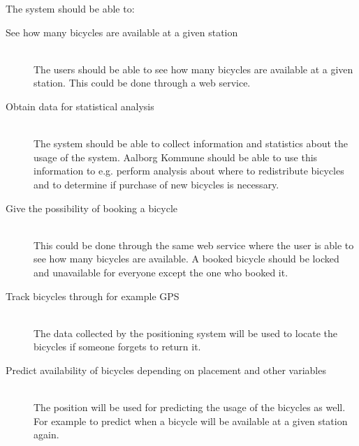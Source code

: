 The system should be able to:
\begin{description}
\item[See how many bicycles are available at a given station] \hfill \\
The users should be able to see how many bicycles are available at a given station.
This could be done through a web service.
\item[Obtain data for statistical analysis] \hfill \\
The system should be able to collect information and statistics about the usage of the system.
Aalborg Kommune should be able to use this information to e.g. perform analysis about where to redistribute bicycles and to determine if purchase of new bicycles is necessary.
\item[Give the possibility of booking a bicycle] \hfill \\
This could be done through the same web service where the user is able to see how many bicycles are available.
A booked bicycle should be locked and unavailable for everyone except the one who booked it.
\item[Track bicycles through for example GPS] \hfill \\
The data collected by the positioning system will be used to locate the bicycles if someone forgets to return it.
\item[Predict availability of bicycles depending on placement and other variables] \hfill \\
The position will be used for predicting the usage of the bicycles as well. 
For example to predict when a bicycle will be available at a given station again.
\end{description}